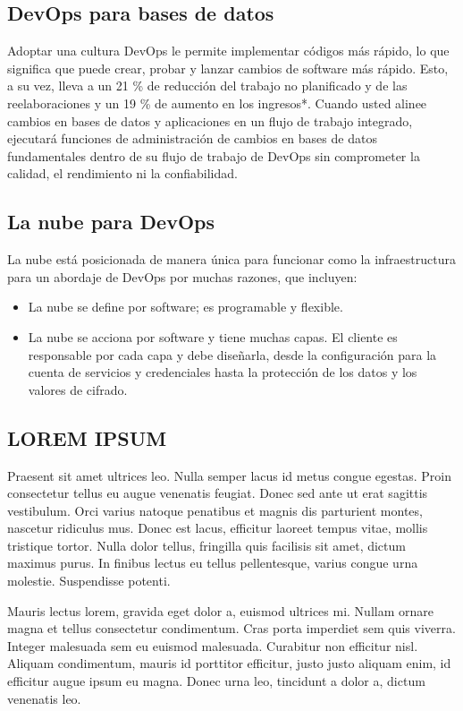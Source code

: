\documentclass[preprint,12pt]{elsarticle}
\begin{document}
\subsection{DevOps para bases de datos}	


Adoptar una cultura DevOps le permite implementar códigos más rápido, lo que significa que puede crear, probar y lanzar cambios de software más rápido. Esto, a su vez, lleva a un 21 \% de reducción del trabajo no planificado y de las reelaboraciones y un 19 \% de aumento en los ingresos*. Cuando usted alinee cambios en bases de datos y aplicaciones en un flujo de trabajo integrado, ejecutará funciones de administración de cambios en bases de datos fundamentales dentro de su flujo de trabajo de DevOps sin comprometer la calidad, el rendimiento ni la confiabilidad.


\subsection{La nube para DevOps}

La nube está posicionada de manera única para funcionar como la infraestructura para un abordaje de DevOps por muchas razones, que incluyen:
\begin{itemize}

\item La nube se define por software; es programable y flexible.
\item La nube se acciona por software y tiene muchas capas. El cliente es responsable por cada capa y debe diseñarla, desde la configuración para la cuenta de servicios y credenciales hasta la protección de los datos y los valores de cifrado.
\end{itemize} 


\subsection{LOREM IPSUM}
	
Praesent sit amet ultrices leo. Nulla semper lacus id metus congue egestas. Proin consectetur tellus eu augue venenatis feugiat. Donec sed ante ut erat sagittis vestibulum. Orci varius natoque penatibus et magnis dis parturient montes, nascetur ridiculus mus. Donec est lacus, efficitur laoreet tempus vitae, mollis tristique tortor. Nulla dolor tellus, fringilla quis facilisis sit amet, dictum maximus purus. In finibus lectus eu tellus pellentesque, varius congue urna molestie. Suspendisse potenti.

Mauris lectus lorem, gravida eget dolor a, euismod ultrices mi. Nullam ornare magna et tellus consectetur condimentum. Cras porta imperdiet sem quis viverra. Integer malesuada sem eu euismod malesuada. Curabitur non efficitur nisl. Aliquam condimentum, mauris id porttitor efficitur, justo justo aliquam enim, id efficitur augue ipsum eu magna. Donec urna leo, tincidunt a dolor a, dictum venenatis leo.
\end{document}
